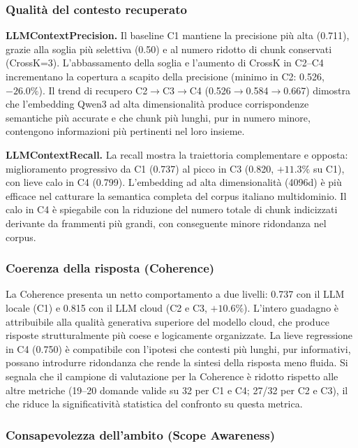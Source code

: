 \documentclass[11pt,a4paper]{article}
\begin{document}
\subsubsection{Qualità del contesto recuperato}

\textbf{LLMContextPrecision.} Il baseline C1 mantiene la precisione più alta (0.711),
grazie alla soglia più selettiva (0.50) e al numero ridotto di chunk conservati
(CrossK=3). L'abbassamento della soglia e l'aumento di CrossK in C2--C4 incrementano
la copertura a scapito della precisione (minimo in C2: 0.526, $-26.0\%$).
Il trend di recupero C2$\to$C3$\to$C4 (0.526$\to$0.584$\to$0.667) dimostra che
l'embedding Qwen3 ad alta dimensionalità produce corrispondenze semantiche più
accurate e che chunk più lunghi, pur in numero minore, contengono informazioni più
pertinenti nel loro insieme.

\textbf{LLMContextRecall.} La recall mostra la traiettoria complementare e opposta:
miglioramento progressivo da C1 (0.737) al picco in C3 (0.820, $+11.3\%$ su C1),
con lieve calo in C4 (0.799). L'embedding ad alta dimensionalità (4096d) è più
efficace nel catturare la semantica completa del corpus italiano multidominio.
Il calo in C4 è spiegabile con la riduzione del numero totale di chunk indicizzati
derivante da frammenti più grandi, con conseguente minore ridondanza nel corpus.

\subsubsection{Coerenza della risposta (Coherence)}

La Coherence presenta un netto comportamento a due livelli: 0.737 con il LLM locale
(C1) e 0.815 con il LLM cloud (C2 e C3, $+10.6\%$). L'intero guadagno è attribuibile
alla qualità generativa superiore del modello cloud, che produce risposte strutturalmente
più coese e logicamente organizzate. La lieve regressione in C4 (0.750) è compatibile
con l'ipotesi che contesti più lunghi, pur informativi, possano introdurre ridondanza
che rende la sintesi della risposta meno fluida. Si segnala che il campione di valutazione
per la Coherence è ridotto rispetto alle altre metriche (19--20 domande valide su 32
per C1 e C4; 27/32 per C2 e C3), il che riduce la significatività statistica del
confronto su questa metrica.

\subsubsection{Consapevolezza dell'ambito (Scope Awareness)}
\end{document}
